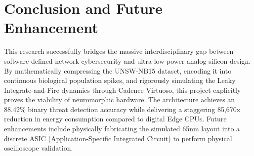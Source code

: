 \documentclass{ieeeaccess}
\begin{document}
\section{Conclusion and Future Enhancement}
This research successfully bridges the massive interdisciplinary gap between software-defined network cybersecurity and ultra-low-power analog silicon design. By mathematically compressing the UNSW-NB15 dataset, encoding it into continuous biological population spikes, and rigorously simulating the Leaky Integrate-and-Fire dynamics through Cadence Virtuoso, this project explicitly proves the viability of neuromorphic hardware.
The architecture achieves an 88.42\% binary threat detection accuracy while delivering a staggering 85,670x reduction in energy consumption compared to digital Edge CPUs. 
Future enhancements include physically fabricating the simulated 65nm layout into a discrete ASIC (Application-Specific Integrated Circuit) to perform physical oscilloscope validation.
\end{document}
